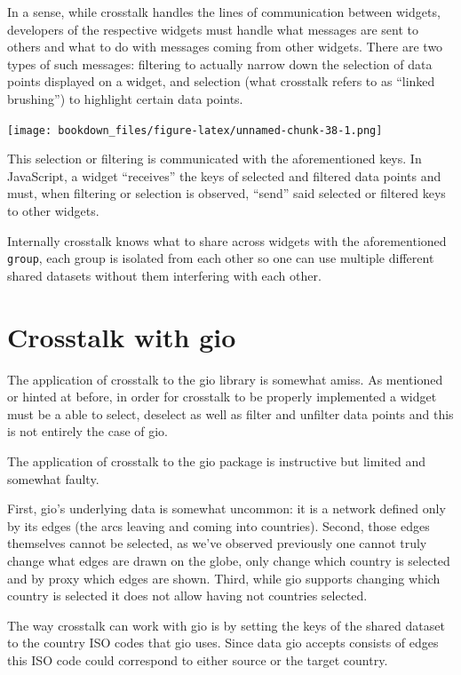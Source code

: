 \documentclass[
]{krantz}
\makeatletter
\newenvironment{kframe}{%
\medskip{}
\setlength{\fboxsep}{.8em}
 \def\at@end@of@kframe{}%
 \ifinner\ifhmode%
  \def\at@end@of@kframe{\end{minipage}}%
  \begin{minipage}{\columnwidth}%
 \fi\fi%
 \def\FrameCommand##1{\hskip\@totalleftmargin \hskip-\fboxsep
 \colorbox{shadecolor}{##1}\hskip-\fboxsep
     \hskip-\linewidth \hskip-\@totalleftmargin \hskip\columnwidth}%
 \MakeFramed {\advance\hsize-\width
   \@totalleftmargin\z@ \linewidth\hsize
   \@setminipage}}%
 {\par\unskip\endMakeFramed%
 \at@end@of@kframe}
\newenvironment{rmdblock}[1]
  {
  \begin{itemize}
  \renewcommand{\labelitemi}{
    \raisebox{-.7\height}[0pt][0pt]{
      {\setkeys{Gin}{width=3em,keepaspectratio}\texttt{[image: images/\#1]}}
    }
  }
  \setlength{\fboxsep}{1em}
  \begin{kframe}
  \item
  }
  {
  \end{kframe}
  \end{itemize}
  }
\newenvironment{rmdnote}
  {\begin{rmdblock}{note}}
  {\end{rmdblock}}
\makeatother
\begin{document}
In a sense, while crosstalk handles the lines of communication between widgets, developers of the respective widgets must handle what messages are sent to others and what to do with messages coming from other widgets. There are two types of such messages: filtering to actually narrow down the selection of data points displayed on a widget, and selection (what crosstalk refers to as ``linked brushing'') to highlight certain data points.

\texttt{[image: bookdown\_files/figure-latex/unnamed-chunk-38-1.png]}

This selection or filtering is communicated with the aforementioned keys. In JavaScript, a widget ``receives'' the keys of selected and filtered data points and must, when filtering or selection is observed, ``send'' said selected or filtered keys to other widgets.

Internally crosstalk knows what to share across widgets with the aforementioned \texttt{group}, each group is isolated from each other so one can use multiple different shared datasets without them interfering with each other.

\hypertarget{crosstalk-with-gio}{%
\section{Crosstalk with gio}\label{crosstalk-with-gio}}

The application of crosstalk to the gio library is somewhat amiss. As mentioned or hinted at before, in order for crosstalk to be properly implemented a widget must be a able to select, deselect as well as filter and unfilter data points and this is not entirely the case of gio.

\begin{rmdnote}
The application of crosstalk to the gio package is instructive but
limited and somewhat faulty.
\end{rmdnote}

First, gio's underlying data is somewhat uncommon: it is a network defined only by its edges (the arcs leaving and coming into countries). Second, those edges themselves cannot be selected, as we've observed previously one cannot truly change what edges are drawn on the globe, only change which country is selected and by proxy which edges are shown. Third, while gio supports changing which country is selected it does not allow having not countries selected.

The way crosstalk can work with gio is by setting the keys of the shared dataset to the country ISO codes that gio uses. Since data gio accepts consists of edges this ISO code could correspond to either source or the target country.
\end{document}
